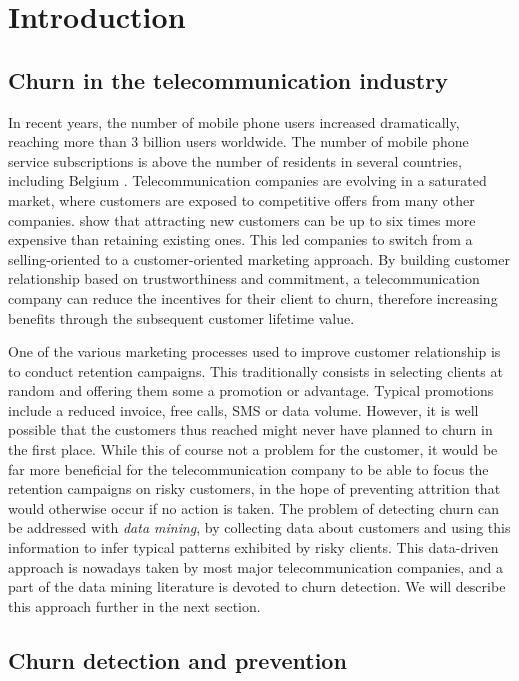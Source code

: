 \chapter{Introduction}
\label{ch:intro}

\section{Churn in the telecommunication industry}

In recent years, the number of mobile phone users increased dramatically,
reaching more than 3 billion users worldwide. The number of mobile phone service
subscriptions is above the number of residents in several countries, including
Belgium \parencite{itu2018itu}. Telecommunication companies are evolving in a
saturated market, where customers are exposed to competitive offers from many
other companies. \textcite{hadden2007computer} show that attracting new
customers can be up to six times more expensive than retaining existing ones.
This led companies to switch from a selling-oriented to a customer-oriented
marketing approach. By building customer relationship based on trustworthiness
and commitment, a telecommunication company can reduce the incentives for their
client to churn, therefore increasing benefits through the subsequent customer
lifetime value.

One of the various marketing processes used to improve customer relationship is
to conduct retention campaigns. This traditionally consists in selecting clients
at random and offering them some a promotion or advantage. Typical promotions
include a reduced invoice, free calls, SMS or data volume. However, it is well
possible that the customers thus reached might never have planned to churn in
the first place. While this of course not a problem for the customer, it would
be far more beneficial for the telecommunication company to be able to focus the
retention campaigns on risky customers, in the hope of preventing attrition that
would otherwise occur if no action is taken. The problem of detecting churn can
be addressed with \emph{data mining}, by collecting data about customers and
using this information to infer typical patterns exhibited by risky clients.
This data-driven approach is nowadays taken by most major telecommunication
companies, and a part of the data mining literature is devoted to churn
detection. We will describe this approach further in the next section.



\section{Churn detection and prevention}

